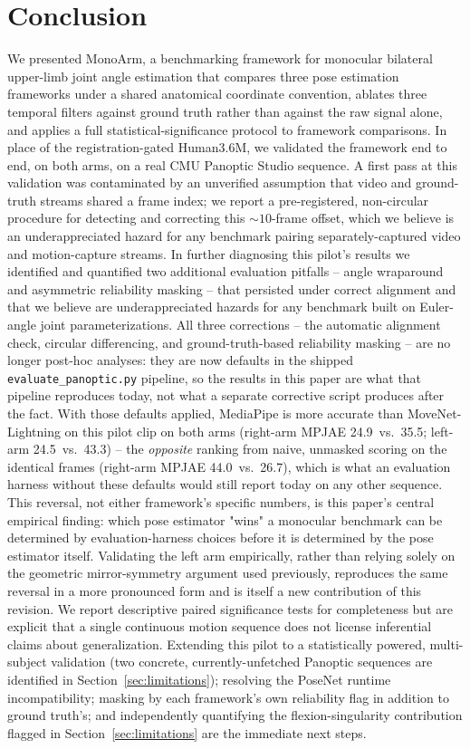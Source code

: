 \documentclass[conference]{IEEEtran}
\begin{document}
\section{Conclusion}
We presented MonoArm, a benchmarking framework for monocular bilateral
upper-limb joint angle estimation that compares three pose estimation
frameworks under a shared anatomical coordinate convention, ablates
three temporal filters against ground truth rather than against the raw
signal alone, and applies a full statistical-significance protocol to
framework comparisons. In place of the registration-gated Human3.6M, we
validated the framework end to end, on both arms, on a real CMU Panoptic
Studio sequence. A first pass at this validation was contaminated by an
unverified assumption that video and ground-truth streams shared a frame
index; we report a pre-registered, non-circular procedure for detecting
and correcting this $\sim\!10$-frame offset, which we believe is an
underappreciated hazard for any benchmark pairing separately-captured
video and motion-capture streams. In further diagnosing this pilot's
results we identified and quantified two additional evaluation pitfalls
-- angle wraparound and asymmetric reliability masking -- that persisted
under correct alignment and that we believe are underappreciated hazards
for any benchmark built on Euler-angle joint parameterizations. All
three corrections -- the automatic alignment check, circular
differencing, and ground-truth-based reliability masking -- are no
longer post-hoc analyses: they are now defaults in the shipped
\texttt{evaluate\_panoptic.py} pipeline, so the results in this paper are
what that pipeline reproduces today, not what a separate corrective
script produces after the fact. With those defaults applied, MediaPipe
is more accurate than MoveNet-Lightning on this pilot clip on both arms
(right-arm MPJAE 24.9\textdegree\ vs.\ 35.5\textdegree; left-arm
24.5\textdegree\ vs.\ 43.3\textdegree) -- the \emph{opposite} ranking
from naive, unmasked scoring on the identical frames (right-arm MPJAE
44.0\textdegree\ vs.\ 26.7\textdegree), which is what an evaluation
harness without these defaults would still report today on any other
sequence. This reversal, not either framework's specific numbers, is
this paper's central empirical finding: which pose estimator "wins" a
monocular benchmark can be determined by evaluation-harness choices
before it is determined by the pose estimator itself. Validating the
left arm empirically, rather than relying solely on the geometric
mirror-symmetry argument used previously, reproduces the same reversal
in a more pronounced form and is itself a new contribution of this
revision. We report descriptive paired significance tests for
completeness but are explicit that a single continuous motion sequence
does not license inferential claims about generalization. Extending
this pilot to a statistically powered, multi-subject validation (two
concrete, currently-unfetched Panoptic sequences are identified in
Section~\ref{sec:limitations}); resolving the PoseNet runtime
incompatibility; masking by each framework's own reliability flag in
addition to ground truth's; and independently quantifying the
flexion-singularity contribution flagged in
Section~\ref{sec:limitations} are the immediate next steps.
\end{document}
